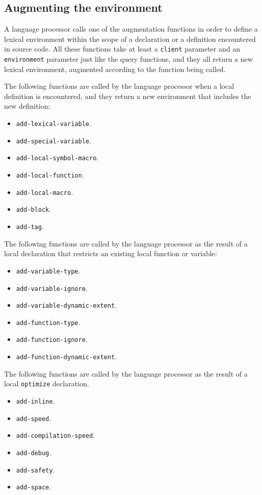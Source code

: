 \subsection{Augmenting the environment}

A language processor calls one of the augmentation functions in order
to define a lexical environment within the scope of a declaration or a
definition encountered in source code.  All these functions take at
least a \texttt{client} parameter and an \texttt{environment}
parameter just like the query functions, and they all return a new
lexical environment, augmented according to the function being called.

The following functions are called by the language processor when a
local definition is encountered, and they return a new environment that
includes the new definition:

\begin{itemize}
\item \texttt{add-lexical-variable}.
\item \texttt{add-special-variable}.
\item \texttt{add-local-symbol-macro}.
\item \texttt{add-local-function}.
\item \texttt{add-local-macro}.
\item \texttt{add-block}.
\item \texttt{add-tag}.
\end{itemize}

\noindent
The following functions are called by the language processor as the
result of a local declaration that restricts an existing local
function or variable:

\begin{itemize}
\item \texttt{add-variable-type}.
\item \texttt{add-variable-ignore}.
\item \texttt{add-variable-dynamic-extent}.
\item \texttt{add-function-type}.
\item \texttt{add-function-ignore}.
\item \texttt{add-function-dynamic-extent}.
\end{itemize}

\noindent
The following functions are called by the language processor as the
result of a local \texttt{optimize} declaration.

\begin{itemize}
\item \texttt{add-inline}.
\item \texttt{add-speed}.
\item \texttt{add-compilation-speed}.
\item \texttt{add-debug}.
\item \texttt{add-safety}.
\item \texttt{add-space}.
\end{itemize}

